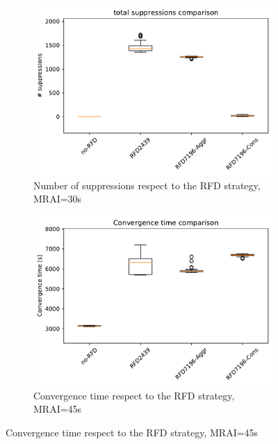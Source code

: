 \begin{figure}[H]
\begin{subfigure}[b]{0.325\textwidth}
         \label{fig:1000_RFD_MRAI30_messages_mice}
     \end{subfigure}
     \hfill
     \begin{subfigure}[b]{0.325\textwidth}
         \centering
         \includegraphics[width=\textwidth]{images/RFD/miceVSelephants/MultiMRAI/30/mice/cisco_1000MRAI30_rfd_comparison_suppressions_boxplot.pdf}
         \caption{Number of suppressions respect to the RFD strategy, MRAI=30s}
         \label{fig:1000_RFD_MRAI30_suppressions_mice}
     \end{subfigure}
     \vfill
     \begin{subfigure}[b]{0.325\textwidth}
         \centering
         \includegraphics[width=\textwidth]{images/RFD/miceVSelephants/MultiMRAI/45/mice/cisco_1000MRAI45_rfd_comparison_time_boxplot.pdf}
         \caption{Convergence time respect to the RFD strategy, MRAI=45s}

\end{subfigure}
\end{figure}
